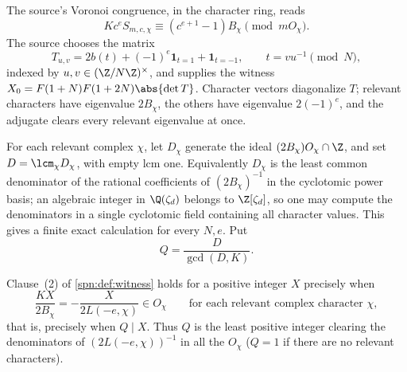 The source's Voronoi congruence, in the character ring, reads
\begin{equation}\label{spn:eq:voronoi}
 Kc^eS_{m,c,\chi}\equiv(c^{e+1}-1)B_\chi\pmod{mO_\chi}.
\end{equation}
The source chooses the matrix
\[
 T_{u,v}=2b(t)+(-1)^e\mathbf 1_{t=1}+\mathbf 1_{t=-1},\qquad
 t=vu^{-1}\pmod N ,
\]
indexed by $u,v\in(\Z/N\Z)^\times$, and supplies the witness
$X_0=F(1+N)F(1+2N)\abs{\det T}$. Character vectors diagonalize $T$; relevant
characters have eigenvalue $2B_\chi$, the others have eigenvalue $2(-1)^e$,
and the adjugate clears every relevant eigenvalue at once.

For each relevant complex $\chi$, let $D_\chi$ generate the ideal
$(2B_\chi)O_\chi\cap\Z$, and set $D=\lcm_\chi D_\chi$, with empty lcm one.
Equivalently $D_\chi$ is the least common denominator of the rational
coefficients of $(2B_\chi)^{-1}$ in the cyclotomic power basis; an algebraic
integer in $\Q(\zeta_d)$ belongs to $\Z[\zeta_d]$, so one may compute the
denominators in a single cyclotomic field containing all character values.
This gives a finite exact calculation for every $N,e$. Put
\begin{equation}\label{spn:eq:Q}
 Q=\frac{D}{\gcd(D,K)} .
\end{equation}

\begin{theorem}\label{spn:thm:second-clause}
Clause~(2) of \cref{spn:def:witness} holds for a positive integer $X$
precisely when
\begin{equation}\label{spn:eq:clause-two}
 \frac{KX}{2B_\chi}=-\frac{X}{2L(-e,\chi)}\in O_\chi
 \qquad\text{for each relevant complex character }\chi ,
\end{equation}
that is, precisely when $Q\mid X$. Thus $Q$ is the least positive integer
clearing the denominators of $(2L(-e,\chi))^{-1}$ in all the $O_\chi$
($Q=1$ if there are no relevant characters).
\end{theorem}

